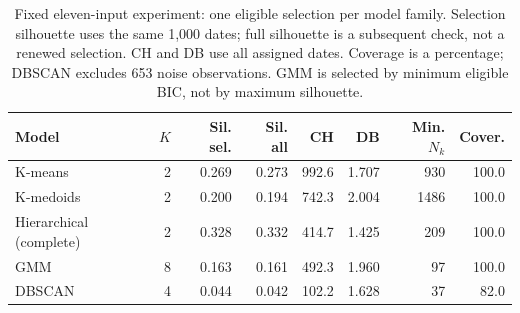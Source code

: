 \begin{table}[htbp]
\centering
\footnotesize
\begin{tabularx}{\textwidth}{@{}Xrrrrrrr@{}}
\toprule
Model & $K$ & Sil. sel. & Sil. all & CH & DB & Min. $N_k$ & Cover.\\
\midrule
K-means & 2 & 0.269 & 0.273 & 992.6 & 1.707 & 930 & 100.0\\
K-medoids & 2 & 0.200 & 0.194 & 742.3 & 2.004 & 1486 & 100.0\\
Hierarchical (complete) & 2 & 0.328 & 0.332 & 414.7 & 1.425 & 209 & 100.0\\
GMM & 8 & 0.163 & 0.161 & 492.3 & 1.960 & 97 & 100.0\\
DBSCAN & 4 & 0.044 & 0.042 & 102.2 & 1.628 & 37 & 82.0\\
\bottomrule
\end{tabularx}
\caption{Fixed eleven-input experiment: one eligible selection per model family. Selection silhouette uses the same 1,000 dates; full silhouette is a subsequent check, not a renewed selection. CH and DB use all assigned dates. Coverage is a percentage; DBSCAN excludes 653 noise observations. GMM is selected by minimum eligible BIC, not by maximum silhouette.}
\label{tab:fixed11-models}
\end{table}
